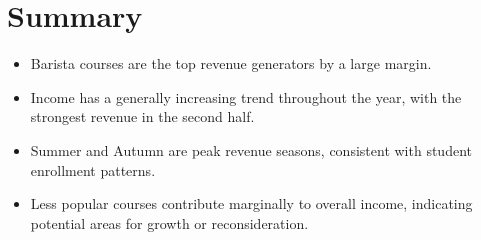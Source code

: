 \documentclass[12pt,a4paper]{article}
\begin{document}
\section*{Summary}

\begin{itemize}
    \item Barista courses are the top revenue generators by a large margin.
    \item Income has a generally increasing trend throughout the year, with the strongest revenue in the second half.
    \item Summer and Autumn are peak revenue seasons, consistent with student enrollment patterns.
    \item Less popular courses contribute marginally to overall income, indicating potential areas for growth or reconsideration.
\end{itemize}
\end{document}
